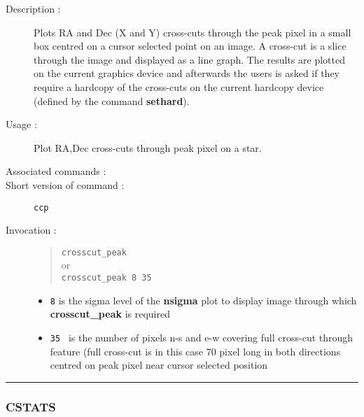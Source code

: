 \begin{description}

\item[Description :] Plots RA and Dec (X and Y) cross-cuts through the
peak pixel in a small box centred on a cursor selected point on an
image.  A cross-cut is a slice through the image and displayed as a
line graph.  The results are plotted on the current graphics device and
afterwards the users is asked if they require a hardcopy of the
cross-cuts on the current hardcopy device (defined by the command {\bf
sethard}).

\item[Usage :] Plot RA,Dec cross-cuts through peak pixel on a star.
\item[Associated commands :] {\tt {}}
\item[Short version of command :] {\tt ccp}
\item[Invocation :]

\begin{quote}{\tt  crosscut\_peak }\\
or \\
{\tt crosscut\_peak 8 35 }
\end{quote}

\begin{itemize}

\item {\tt 8} is the sigma level of the {\bf nsigma} plot to display image
through which {\bf crosscut\_peak} is required
\item {\tt 35 } is the number of pixels n-s and e-w covering full
cross-cut through feature (full cross-cut is in this case
70 pixel long in both directions centred on peak pixel
near cursor selected position
\end{itemize}\end{description}

\hrule
\subsubsection*{\label{CSTATS}CSTATS}

